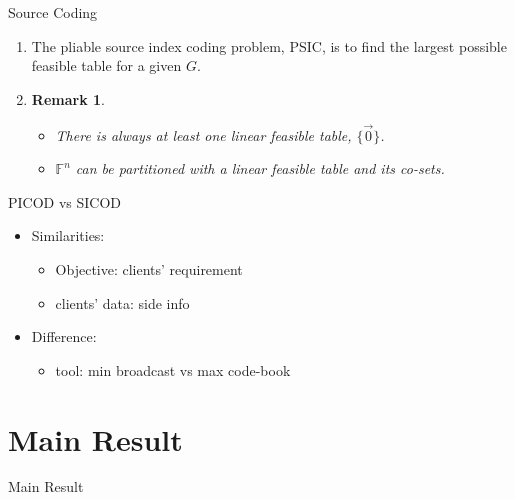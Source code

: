 \documentclass[xcolor=dvipsnames, aspectratio=169]{beamer}
\newtheorem{remark}[theorem]{Remark}
\begin{document}
\begin{frame}{Source Coding }
	\begin{enumerate}[]
		\item<1->[]
		\begin{definition}
			The pliable source index coding problem, PSIC, is to find the largest possible feasible table for a given $G$.
		\end{definition}
		\item<2->[]
		\begin{remark}
			\begin{itemize}[label=\Roman*.]
				\item<2->[] There is always at least one linear feasible table, $\{\overrightarrow{0}\}$.
				\item<3->[] $\mathbb{F}^n$ can be partitioned with a linear feasible table and its co-sets.
			\end{itemize}
		\end{remark}
	\end{enumerate}
\end{frame}
\begin{frame}{PICOD vs SICOD}
	\begin{itemize}
	\item<1->[]	Similarities: 
	\begin{itemize}
		\item <2->[]
				Objective: clients' requirement
		\item<3->[]
		clients' data: side info
	\end{itemize}
	\item<4->[]	Difference: 
	\begin{itemize}
		\item <5->[]
		tool: min broadcast vs max code-book
	\end{itemize}
\end{itemize}
\end{frame}

\section{Main Result}
\begin{frame}
	\centering
	\Huge
	Main Result
\end{frame}
\end{document}
